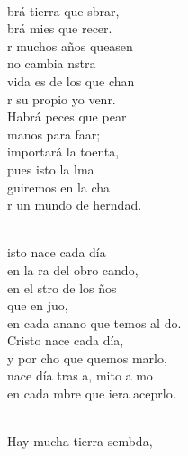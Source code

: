 \documentclass[12pt]{article}
\begin{document}
\begin{multicols*}{2}
\begin{cancion}%
	   \chord{(}{**)}{    }\\
	brá tierra que sbrar,\\
	brá mies que recer.\\
	r muchos años queasen\\
	no cambia nstra \\
	 vida es de los que chan\\
	r su propio yo venr.\\
\jump
	Habrá peces que pear\\
	manos para faar;\\
	 importará la toenta,\\
	pues isto la lma\\
	guiremos en la cha\\
	r un mundo de herndad. \\\jump\\
	\begin{chorus}%
	isto nace cada día\\
	en la ra del obro cando,\\
	en el stro de los ños\\
	que en juo, \\
	en cada anano que temos al do.\\
Cristo nace cada día,\\
	y por cho que quemos marlo,\\
	nace día tras a, mito a mo  \\
	en cada mbre que iera aceprlo.\\
	\end{chorus}%
	\jump\\
	Hay mucha tierra sembda,\\

\end{cancion}
\end{multicols*}
\end{document}
